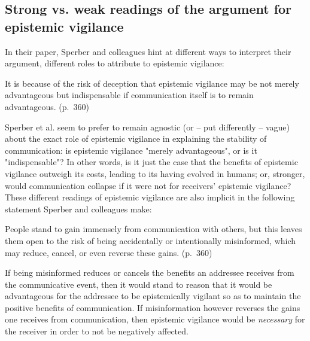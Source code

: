 \subsection{Strong vs. weak readings of the argument for epistemic vigilance}

In their \citeyear{Sperber10} paper, Sperber and colleagues hint at different ways to interpret their argument, different roles to attribute to epistemic vigilance:

\begin{quoting}
    It is because of the risk of deception that epistemic vigilance may be not merely advantageous but indispensable if communication itself is to remain advantageous.
\hfill (p.~360)
\end{quoting}
Sperber et al. seem to prefer to remain agnostic (or -- put differently -- vague) about the exact role of epistemic vigilance in explaining the stability of communication: is epistemic vigilance "merely advantageous", or is it "indispensable"? In other words, is it just the case that the benefits of epistemic vigilance outweigh its costs, leading to its having evolved in humans; or, stronger, would communication collapse if it were not for receivers' epistemic vigilance?
These different readings of epistemic vigilance are also implicit in the following statement Sperber and colleagues make:
\begin{quoting}
    People stand to gain immensely from communication with others, but this leaves them open to the risk of being accidentally or intentionally misinformed, which may reduce, cancel, or even reverse these gains.
\hfill (p.~360)
\end{quoting}
If being misinformed reduces or cancels the benefits an addressee receives from the communicative event, then it would stand to reason that it would be advantageous for the addressee to be epistemically vigilant so as to maintain the positive benefits of communication. If misinformation however reverses the gains one receives from communication, then epistemic vigilance would be \emph{necessary} for the receiver in order to not be negatively affected.

